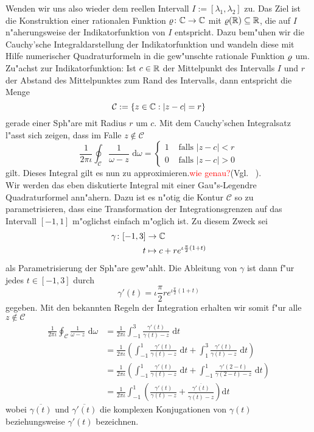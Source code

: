 Wenden wir uns also wieder dem reellen Intervall $I := [\lambda_1, \lambda_2]$ zu. Das Ziel ist
die Konstruktion einer rationalen Funktion $\varrho\colon\mathbb{C}\to\mathbb{C}$ mit $\varrho(\mathbb{R}) \subseteq \mathbb{R}$,
die auf $I$ n"aherungsweise der Indikatorfunktion von $I$ entspricht. Dazu
bem"uhen wir die Cauchy'sche Integraldarstellung der Indikatorfunktion und
wandeln diese mit Hilfe numerischer Quadraturformeln in die gew"unschte
rationale Funktion $\varrho$ um.\\

Zu"achst zur Indikatorfunktion: Ist $c\in\mathbb{R}$ der Mittelpunkt des Intervalls $I$ und
$r$ der Abstand des Mittelpunktes zum Rand des Intervalls, dann entspricht die Menge
\[
\mathcal{C} := \{z\in\mathbb{C} : |z-c| = r\}
\]
gerade einer Sph"are mit Radius $r$ um $c$. Mit dem Cauchy'schen Integralsatz
l"asst sich zeigen, dass im Falle $z\notin \mathcal{C}$
\[
\frac{1}{2\pi\iota}\oint_{ \mathcal{C}}\frac{1}{\omega-z}\text{ d}\omega
= \begin{cases}1 &\text{ falls }|z-c| < r \\ 0 &\text{ falls }|z-c| > 0 \end{cases}
\]
gilt. Dieses Integral gilt es nun zu approximieren.\textcolor{red}{wie genau?}(Vgl. ~\cite[20]{jaenich}).\\

Wir werden das eben diskutierte Integral mit einer Gau"s-Legendre Quadraturformel ann"ahern.
Dazu ist es n"otig die Kontur $\mathcal{C}$ so zu parametrisieren, dass eine Transformation
der Integrationsgrenzen auf das Intervall $[-1,1]$ m"oglichst einfach m"oglich ist. Zu diesem Zweck sei
\begin{align*}
\gamma\colon[-1,3]&\to\mathbb{C} \\
t&\mapsto c+re^{\iota \frac{\pi}{2}(1+t)}
\end{align*}
als Parametrisierung der Sph"are gew"ahlt. Die
Ableitung von $\gamma$ ist dann f"ur jedes $t\in[-1,3]$ durch
\[
\gamma'(t)=\iota \frac{\pi}{2}re^{\iota \frac{\pi}{2}(1+t)}
\]
gegeben. Mit den bekannten Regeln der Integration erhalten wir somit f"ur alle $z\notin\mathcal{C}$
\begin{align*}
\frac{1}{2\pi\iota}\oint_{ \mathcal{C}}\frac{1}{\omega-z}\text{ d}\omega
&= \frac{1}{2\pi\iota} \int_{-1}^3 \frac{\gamma'(t)}{\gamma(t)-z}\text{ d}t \\
&= \frac{1}{2\pi\iota} \left( \int_{-1}^1 \frac{\gamma'(t)}{\gamma(t)-z} \text{ d}t +
\int_{1}^3\frac{\gamma'(t)}{\gamma(t)-z}\text{ d}t \right) \\
&= \frac{1}{2\pi\iota} \left( \int_{-1}^1 \frac{\gamma'(t)}{\gamma(t)-z} \text{ d}t +
\int_{-1}^1\frac{\gamma'(2-t)}{\gamma(2-t)-z}\text{ d}t \right) \\
&= \frac{1}{2\pi\iota} \int_{-1}^1 \left( \frac{\gamma'(t)}{\gamma(t)-z} +
\frac{\overline{\gamma'(t)}}{\overline{\gamma(t)}-z}\right)\text{d}t
\end{align*}
wobei $\overline{\gamma(t)}$ und $\overline{\gamma'(t)}$ die komplexen Konjugationen
von $\gamma(t)$ beziehungsweise $\gamma'(t)$ bezeichnen.\\

